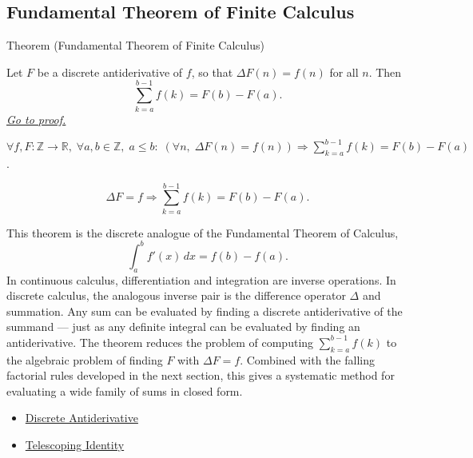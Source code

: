
\subsection*{Fundamental Theorem of Finite Calculus}

\begin{theorembox}{Theorem (Fundamental Theorem of Finite Calculus)}
\begin{theorem}
\label{thm:fundamental-theorem-finite-calculus}
Let \(F\) be a discrete antiderivative of \(f\), so that
\(\Delta F(n) = f(n)\) for all \(n\). Then
\[
\sum_{k=a}^{b-1} f(k) = F(b) - F(a).
\]
\hyperref[prf:fundamental-theorem-finite-calculus]{\textit{Go to proof.}}
\end{theorem}
\end{theorembox}

\begin{remark*}
\(\forall f,F : \mathbb{Z}\to\mathbb{R},\;
\forall a,b \in \mathbb{Z},\; a \le b:\;
(\forall n,\; \Delta F(n) = f(n))
\Rightarrow
\displaystyle\sum_{k=a}^{b-1} f(k) = F(b) - F(a)\).
\end{remark*}

\begin{remark*}
\[
\Delta F=f\Longrightarrow \sum_{k=a}^{b-1}f(k)=F(b)-F(a).
\]
\end{remark*}

\begin{remark*}[Interpretation]
This theorem is the discrete analogue of the Fundamental Theorem of
Calculus,
\[
\int_a^b f'(x)\,dx = f(b)-f(a).
\]
In continuous calculus, differentiation and integration are inverse
operations. In discrete calculus, the analogous inverse pair is the
difference operator \(\Delta\) and summation. Any sum can be evaluated
by finding a discrete antiderivative of the summand --- just as any
definite integral can be evaluated by finding an antiderivative.
The theorem reduces the problem of computing \(\sum_{k=a}^{b-1} f(k)\)
to the algebraic problem of finding \(F\) with \(\Delta F = f\). Combined
with the falling factorial rules developed in the next section, this
gives a systematic method for evaluating a wide family of sums in
closed form.
\end{remark*}

\begin{dependencies}
\begin{itemize}
  \item \hyperref[def:discrete-antiderivative]{Discrete Antiderivative}
  \item \hyperref[thm:telescoping-identity]{Telescoping Identity}
\end{itemize}
\end{dependencies}

